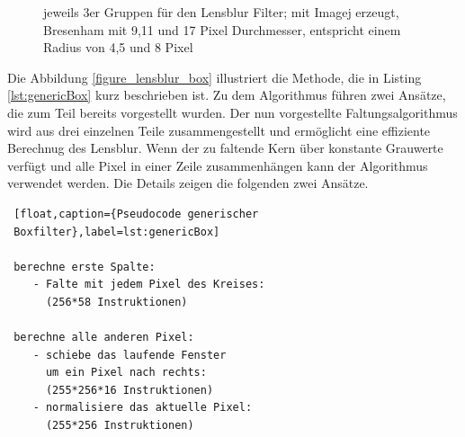 \documentclass[a4paper,12pt]{article}
\begin{document}
\begin{figure}[htbp]
\caption{jeweils 3er Gruppen für den Lensblur Filter;
 mit Imagej erzeugt, Bresenham mit 9,11 und 17
Pixel Durchmesser, entspricht einem Radius von 4,5 und 8 Pixel}
\label{figure_bresenham}
\end{figure}

Die Abbildung \ref{figure_lensblur_box} illustriert die Methode, die in
Listing \ref{lst:genericBox} kurz beschrieben ist. Zu dem Algorithmus führen
zwei Ansätze, die zum Teil bereits vorgestellt wurden. Der nun vorgestellte
Faltungsalgorithmus wird aus drei einzelnen Teile zusammengestellt und
ermöglicht eine effiziente Berechnug des Lensblur. Wenn der zu faltende Kern
über konstante Grauwerte verfügt und alle Pixel in einer Zeile zusammenhängen
kann der Algorithmus verwendet werden. Die Details zeigen die folgenden zwei
Ansätze.
\\

 \begin{lstlisting} [float,caption={Pseudocode generischer
 Boxfilter},label=lst:genericBox]

 berechne erste Spalte: 
 	- Falte mit jedem Pixel des Kreises: 
 	  (256*58 Instruktionen)
 
 berechne alle anderen Pixel:	
 	- schiebe das laufende Fenster 
 	  um ein Pixel nach rechts: 
 	  (255*256*16 Instruktionen)
 	- normalisiere das aktuelle Pixel: 
 	  (255*256 Instruktionen)
 
 \end{lstlisting}
\end{document}
